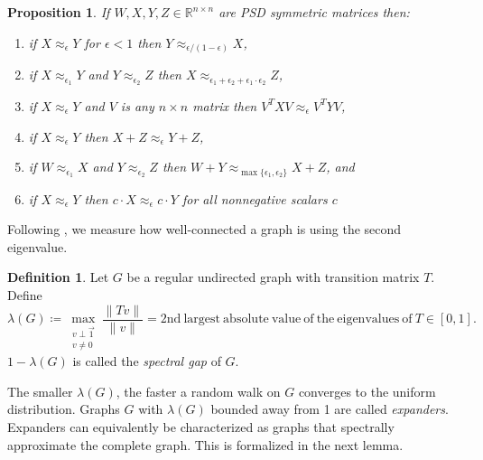 \documentclass[11pt]{article}
\numberwithin{equation}{section}
\newtheorem{proposition}[theorem]{Proposition}
\theoremstyle{definition}
\newtheorem{definition}[theorem]{Definition}
\theoremstyle{plain}
\newcommand{\R}{\mathbb R}
\numberwithin{myalgctr}{section}
\theoremstyle{named}
\begin{document}
\begin{proposition}
\label{prop:psdfacts}
If $W,X, Y,Z\in \R^{n\times n}$ are PSD symmetric matrices then: 
\begin{enumerate}
\item if $X\approx_{\epsilon}Y$ for $\epsilon<1$ then $Y\approx_{\epsilon/(1-\epsilon)}X$,
\item if $X\approx_{\epsilon_1}Y$ and $Y\approx_{\epsilon_2}Z$ then $X\approx_{\epsilon_1 + \epsilon_2+\epsilon_1\cdot\epsilon_2}Z$,
\item if $X\approx_{\epsilon}Y$ and $V$ is any $n\times n$ matrix then $V^{T}XV\approx_{\epsilon}V^{T}YV$,
\item if $X\approx_{\epsilon}Y$ then $X+Z\approx_{\epsilon} Y+Z$,
\item if $W\approx_{\epsilon_1} X$ and $Y\approx_{\epsilon_2} Z$ then $W+Y\approx_{\max\{\epsilon_1,\epsilon_2\}} X+Z$, and
\item if $X\approx_{\epsilon}Y$ then $c\cdot X\approx_{\epsilon}c\cdot Y$ for all nonnegative scalars $c$
\end{enumerate}
\end{proposition}
Following \cite{Tanner84,AlonMi85, Alon86a}, we measure how well-connected a graph is using the second eigenvalue.
\begin{definition} 
\label{def:expansion}
Let $G$ be a regular undirected graph with transition matrix $T$. Define
\[
\lambda(G)\coloneqq\max_{\substack{v\perp\vec{1}\\ v\neq 0}}\frac{\|Tv\|}{\|v\|}=\mathrm{2nd~largest ~absolute~value ~of ~the~ eigenvalues~ of ~}T\in[0,1].
\]
$1-\lambda(G)$ is called the \emph{spectral gap} of $G$.
\end{definition}
%
The smaller $\lambda(G)$, the faster a random walk on $G$ converges to the uniform distribution. Graphs $G$ with $\lambda(G)$ bounded away from 1 are called \emph{expanders}. Expanders can equivalently be characterized as graphs that spectrally approximate the complete graph. This is formalized in the next lemma.
\end{document}

